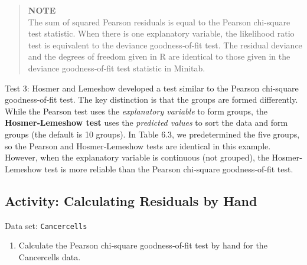 \documentclass[
]{book}
\providecommand{\tightlist}{%
  \setlength{\itemsep}{0pt}\setlength{\parskip}{0pt}}
\begin{document}
\begin{quote}
\textbf{NOTE}\\
The sum of squared Pearson residuals is equal to the Pearson chi‐square test statistic. When there is one explanatory variable, the likelihood ratio test is equivalent to the deviance goodness‐of‐fit test. The residual deviance and the degrees of freedom given in R are identical to those given in the deviance goodness‐of‐fit test statistic in Minitab.
\end{quote}

Test 3: Hosmer and Lemeshow developed a test similar to the Pearson chi‐square goodness‐of‐fit test. The key distinction is that the groups are formed differently. While the Pearson test uses the \emph{explanatory variable} to form groups, the \textbf{Hosmer‐Lemeshow test} uses the \emph{predicted values} to sort the data and form groups (the default is 10 groups). In Table 6.3, we predetermined the five groups, so the Pearson and Hosmer‐Lemeshow tests are identical in this example. However, when the explanatory variable is continuous (not grouped), the Hosmer‐Lemeshow test is more reliable than the Pearson chi‐square goodness‐of‐fit test.

\hypertarget{activity-calculating-residuals-by-hand}{%
\subsection*{Activity: Calculating Residuals by Hand}\label{activity-calculating-residuals-by-hand}}

Data set: \texttt{Cancercells}

\begin{enumerate}
\def\labelenumi{\arabic{enumi}.}
\setcounter{enumi}{28}
\tightlist
\item
  Calculate the Pearson chi‐square goodness‐of‐fit test by hand for the Cancercells data.\\
\end{enumerate}
\end{document}
